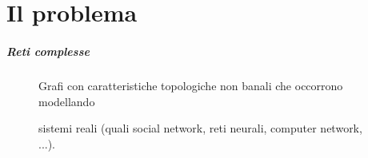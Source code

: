 \part{Il problema}

\begin{frame}
	\partpage
	\centering
\end{frame}

\begin{frame}
	\frametitle{Reti complesse}
	\centering
	\begin{figure}[h]
		\centering
		\begin{flushleft}
			Grafi con caratteristiche topologiche non banali che occorrono modellando 
			
			sistemi reali (quali social network, reti neurali, computer network, ...).
		\end{flushleft}
		\medskip
		

\end{figure}
\end{frame}
